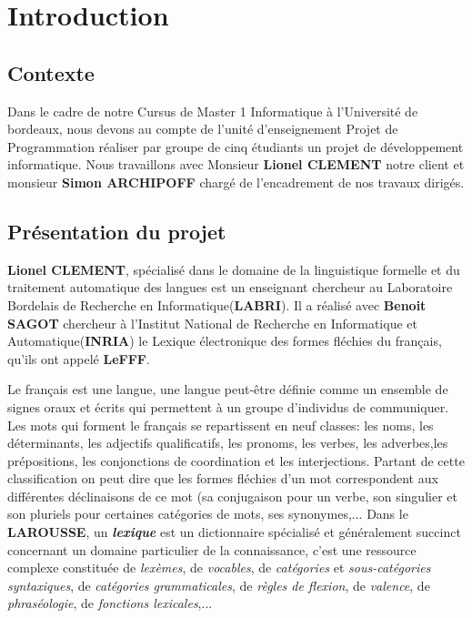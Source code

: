 
\newpage
\section{Introduction}
\subsection{Contexte}
Dans le cadre de notre Cursus de Master 1 Informatique à l'Université de bordeaux, nous devons au compte de 
l'unité d'enseignement Projet de Programmation réaliser par groupe de cinq étudiants un projet de développement
 informatique. Nous travaillons avec Monsieur \textbf{Lionel CLEMENT} notre client et monsieur \textbf{Simon ARCHIPOFF}
 chargé de l'encadrement de nos travaux dirigés.

\subsection{Présentation du projet}

{\textbf{Lionel CLEMENT}, spécialisé dans le domaine de la linguistique formelle et du traitement automatique des langues
 est un enseignant chercheur au Laboratoire Bordelais de Recherche en Informatique(\textbf{LABRI}). Il a réalisé avec 
 \textbf{Benoit SAGOT} chercheur à l'Institut National de Recherche en Informatique et Automatique(\textbf{INRIA})  le Lexique
  électronique des formes fléchies du français, qu'ils ont appelé \textbf{LeFFF}.\par}
{Le français est une langue, une langue peut-être définie comme un ensemble de signes oraux et écrits qui permettent à un groupe
 d'individus de communiquer. Les mots qui forment le français se repartissent en neuf classes: les noms, les déterminants, les adjectifs
  qualificatifs, les pronoms, les verbes, les adverbes,les prépositions, les conjonctions de coordination et les interjections. Partant 
  de cette classification on peut dire que les formes fléchies d'un mot correspondent aux différentes déclinaisons de ce mot (sa conjugaison 
  pour un verbe, son singulier et son pluriels pour certaines catégories de mots, ses synonymes,...
Dans le \textbf{LAROUSSE}, un \textit{\bf lexique} est un dictionnaire spécialisé et généralement succinct concernant un domaine 
particulier de la connaissance, c'est une ressource complexe constituée de \textit{lexèmes}, de \textit{vocables}, de \textit{catégories} 
et \textit{sous-catégories syntaxiques}, de \textit{catégories grammaticales}, de \textit{règles de flexion}, de \textit{valence}, de 
\textit{phraséologie}, de \textit{fonctions lexicales},...\par}


